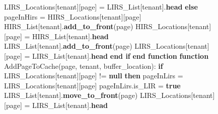 \begin{figure}[htbp]
\begin{minipage}{\linewidth}
\begin{algorithm}[H]
\begin{algorithmic}
            \STATE \hspace{\algorithmicindent} \hspace{\algorithmicindent} LIRS\_Locations[tenant][page] = LIRS\_List[tenant].\textbf{head}
            \STATE \hspace{\algorithmicindent} \textbf{else}
            \STATE \hspace{\algorithmicindent} \hspace{\algorithmicindent} pageInHirs = HIRS\_Locations[tenant][page]
            \STATE \hspace{\algorithmicindent} \hspace{\algorithmicindent} HIRS\_List[tenant].\textbf{add\_to\_front}(page)
            \STATE \hspace{\algorithmicindent} \hspace{\algorithmicindent} HIRS\_Locations[tenant][page] = HIRS\_List[tenant].\textbf{head}
            \STATE \hspace{\algorithmicindent} \hspace{\algorithmicindent} LIRS\_List[tenant].\textbf{add\_to\_front}(page) 
            \STATE \hspace{\algorithmicindent} \hspace{\algorithmicindent} LIRS\_Locations[tenant][page] = LIRS\_List[tenant].\textbf{head}
            \STATE \hspace{\algorithmicindent} \textbf{end if}
            \STATE \textbf{end function}
            \STATE
            \STATE \textbf{function} AddPageToCache(page, tenant, buffer\_location):
            \STATE \hspace{\algorithmicindent} \textbf{if} LIRS\_Locations[tenant][page] != \textbf{null} \textbf{then}
            \STATE \hspace{\algorithmicindent} \hspace{\algorithmicindent} pageInLirs = LIRS\_Locations[tenant][page]
            \STATE \hspace{\algorithmicindent} \hspace{\algorithmicindent} pageInLirs.is\_LIR = \textbf{true}
            \STATE \hspace{\algorithmicindent} \hspace{\algorithmicindent} LIRS\_List[tenant].\textbf{move\_to\_front}(page)
            \STATE \hspace{\algorithmicindent} \hspace{\algorithmicindent} LIRS\_Locations[tenant][page] = LIRS\_List[tenant].\textbf{head}

\end{algorithmic}
\end{algorithm}
\end{minipage}
\end{figure}
